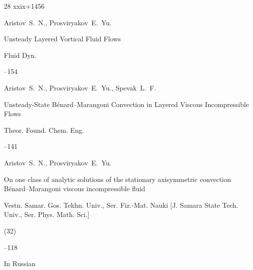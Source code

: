 \begin{thebibliography}{28}
\totalpages xxix+1456 





\by Aristov~S.~N., Prosviryakov~E.~Yu.

\paper Unsteady Layered Vortical Fluid Flows

\jour Fluid Dyn.





--154




\by Aristov~S.~N., Prosviryakov~E.~Yu., Spevak~L.~F.

\paper Unsteady-State B\'enard--Marangoni Convection  in Layered Viscous Incompressible Flows

\jour Theor. Found. Chem. Eng.





--141




\by Aristov~S.~N., Prosviryakov~E.~Yu.

\paper On one class of analytic solutions of the stationary axisymmetric convection B\'enard--Marangoni viscous incompressible fluid

\jour Vestn. Samar. Gos. Tekhn. Univ., Ser. Fiz.-Mat. Nauki \rm [J. Samara State Tech. Univ., Ser. Phys. Math. Sci.]


(32)

--118





\lang In Russian





\end{thebibliography}
